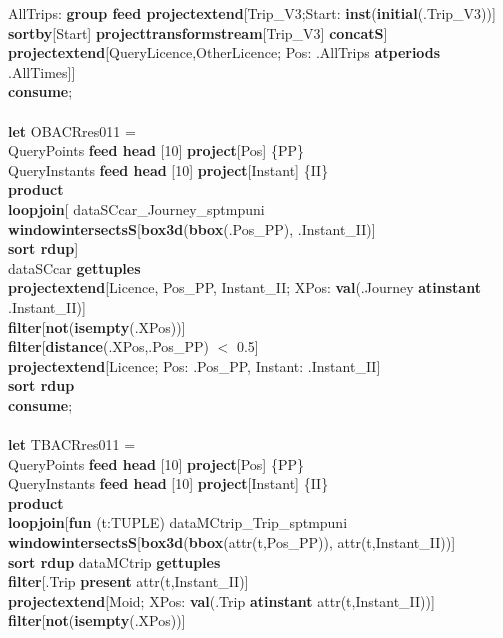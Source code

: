 \documentclass[a4paper]{article}
\newcommand{\op}[1]{\textbf{#1}}
\begin{document}
\begin{scriptsize}
\begin{tabbing}
\>\>\>\>AllTrips: \op{group feed projectextend}[Trip\_V3;Start: \op{inst}(\op{initial}(.Trip\_V3))]\\
\>\>\>\>\>\op{sortby}[Start] \op{projecttransformstream}[Trip\_V3] \op{concatS}]\\
\>\>\op{projectextend}[QueryLicence,OtherLicence; Pos: .AllTrips \op{atperiods} .AllTimes]]\\
\op{consume};\\
\\
\op{let} OBACRres011 =\\
\>QueryPoints \op{feed head} [10] \op{project}[Pos] \{PP\}\\
\>QueryInstants \op{feed head} [10] \op{project}[Instant] \{II\}\\
\>\op{product}\\
\>\op{loopjoin}[ dataSCcar\_Journey\_sptmpuni \op{windowintersectsS}[\op{box3d}(\op{bbox}(.Pos\_PP), .Instant\_II)]\\
\>\>\op{sort rdup}]\\
\>dataSCcar \op{gettuples}\\
\>\op{projectextend}[Licence, Pos\_PP, Instant\_II; XPos: \op{val}(.Journey \op{atinstant} .Instant\_II)]\\
\>\op{filter}[\op{not}(\op{isempty}(.XPos))]\\
\>\op{filter}[\op{distance}(.XPos,.Pos\_PP) $<$ 0.5]\\
\>\op{projectextend}[Licence; Pos: .Pos\_PP, Instant: .Instant\_II]\\
\>\op{sort rdup}\\
\op{consume};\\
\\
\op{let} TBACRres011 =\\
\>QueryPoints \op{feed head} [10] \op{project}[Pos] \{PP\}\\
\>QueryInstants \op{feed head} [10] \op{project}[Instant] \{II\}\\
\>\op{product}\\
\>\op{loopjoin}[\op{fun} (t:TUPLE) dataMCtrip\_Trip\_sptmpuni \op{windowintersectsS}[\op{box3d}(\op{bbox}(attr(t,Pos\_PP)),                       attr(t,Instant\_II))]\\
\>\>\op{sort rdup} dataMCtrip \op{gettuples}\\
\>\>\op{filter}[.Trip \op{present} attr(t,Instant\_II)]\\
\>\>\op{projectextend}[Moid; XPos: \op{val}(.Trip \op{atinstant} attr(t,Instant\_II))]\\
\>\>\op{filter}[\op{not}(\op{isempty}(.XPos))]\\

\end{tabbing}
\end{scriptsize}
\end{document}
